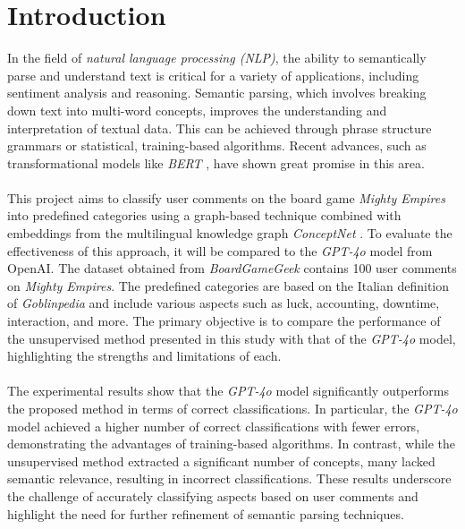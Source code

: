 \documentclass[sn-mathphys-num]{sn-jnl}%
\theoremstyle{thmstyleone}%
\theoremstyle{thmstyletwo}%
\theoremstyle{thmstylethree}%
\begin{document}
\section{Introduction}\label{intro}
    In the field of \textit{natural language processing (NLP)}, the ability to semantically parse and understand text is critical for a variety of applications, including sentiment analysis and reasoning. Semantic parsing, which involves breaking down text into multi-word concepts, improves the understanding and interpretation of textual data. This can be achieved through phrase structure grammars or statistical, training-based algorithms. Recent advances, such as transformational models like \textit{BERT} \cite{DBLP:journals/corr/abs-1810-04805}, have shown great promise in this area.\\\\
    This project aims to classify user comments on the board game \textit{Mighty Empires} \cite{mightyempires1990} into predefined categories using a graph-based technique combined with embeddings from the multilingual knowledge graph \textit{ConceptNet} \cite{DBLP:journals/corr/SpeerCH16}. To evaluate the effectiveness of this approach, it will be compared to the \textit{GPT-4o} \cite{openai_gpt4o} model from OpenAI. The dataset obtained from \textit{BoardGameGeek} \cite{BoardGameGeek} contains 100 user comments on \textit{Mighty Empires}. The predefined categories are based on the Italian definition of \textit{Goblinpedia} \cite{goblinpedia} and include various aspects such as luck, accounting, downtime, interaction, and more. The primary objective is to compare the performance of the unsupervised method presented in this study with that of the \textit{GPT-4o} model, highlighting the strengths and limitations of each.\\\\
    The experimental results show that the \textit{GPT-4o} model significantly outperforms the proposed method in terms of correct classifications. In particular, the \textit{GPT-4o} model achieved a higher number of correct classifications with fewer errors, demonstrating the advantages of training-based algorithms. In contrast, while the unsupervised method extracted a significant number of concepts, many lacked semantic relevance, resulting in incorrect classifications. These results underscore the challenge of accurately classifying aspects based on user comments and highlight the need for further refinement of semantic parsing techniques. 
\end{document}
